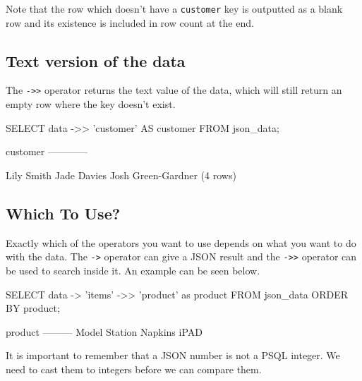 Note that the row which doesn't have a \verb|customer| key is outputted as a blank row and its existence is included in row count at the end.

\subsection*{Text version of the data}
The \verb|->>| operator returns the text value of the data, which will still return an empty row where the key doesn't exist. 
\begin{sql}
SELECT data ->> 'customer' AS customer FROM json_data;
\end{sql}
\begin{pseudo}
customer
------------

Lily Smith
Jade Davies
Josh Green-Gardner
(4 rows)
\end{pseudo}

\subsection*{Which To Use?}
Exactly which of the operators you want to use depends on what you want to do with the data. The \verb|->| operator can give a JSON result and the \verb|->>| operator can be used to search inside it. An example can be seen below.
\begin{sql}
SELECT data -> 'items' ->> 'product' as product
FROM json_data ORDER BY product;
\end{sql}
\begin{pseudo}
product
---------
Model Station
Napkins
iPAD
\end{pseudo}

It is important to remember that a JSON number is not a PSQL integer. We need to cast them to integers before we can compare them. 